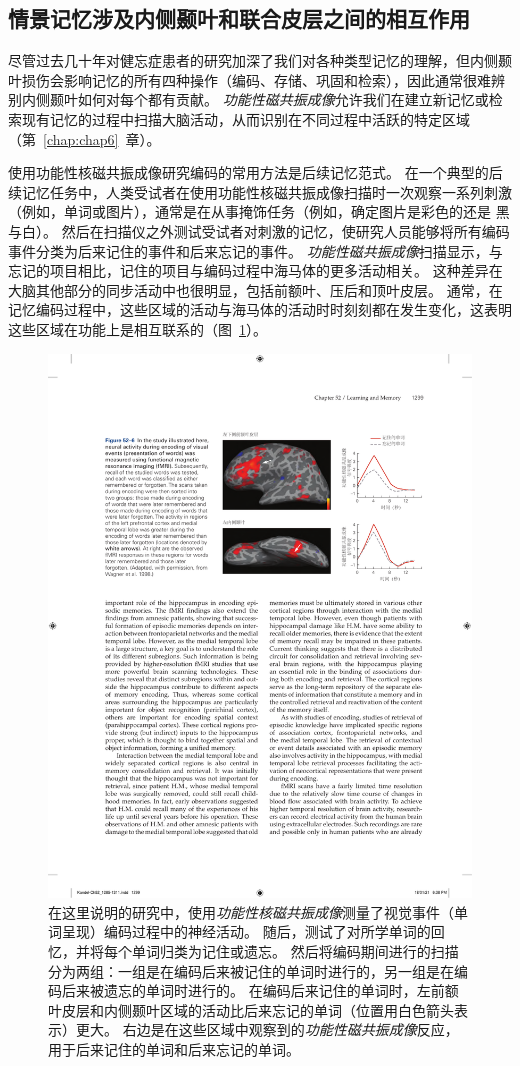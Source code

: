 \subsection{情景记忆涉及内侧颞叶和联合皮层之间的相互作用}

尽管过去几十年对健忘症患者的研究加深了我们对各种类型记忆的理解，但内侧颞叶损伤会影响记忆的所有四种操作（编码、存储、巩固和检索），因此通常很难辨别内侧颞叶如何对每个都有贡献。
\textit{功能性磁共振成像}允许我们在建立新记忆或检索现有记忆的过程中扫描大脑活动，从而识别在不同过程中活跃的特定区域（第~\ref{chap:chap6}~章）。


使用功能性核磁共振成像研究编码的常用方法是后续记忆范式。
在一个典型的后续记忆任务中，人类受试者在使用功能性核磁共振成像扫描时一次观察一系列刺激（例如，单词或图片），通常是在从事掩饰任务（例如，确定图片是彩色的还是 黑与白）。
然后在扫描仪之外测试受试者对刺激的记忆，使研究人员能够将所有编码事件分类为后来记住的事件和后来忘记的事件。
\textit{功能性磁共振成像}扫描显示，与忘记的项目相比，记住的项目与编码过程中海马体的更多活动相关。
这种差异在大脑其他部分的同步活动中也很明显，包括前额叶、压后和顶叶皮层。
通常，在记忆编码过程中，这些区域的活动与海马体的活动时时刻刻都在发生变化，这表明这些区域在功能上是相互联系的（图~\ref{fig:52_6}）。


\begin{figure}[htbp]
	\centering
	\includegraphics[width=0.81\linewidth]{chap52/fig_52_6}
	\caption{在这里说明的研究中，使用\textit{功能性核磁共振成像}测量了视觉事件（单词呈现）编码过程中的神经活动。
		随后，测试了对所学单词的回忆，并将每个单词归类为记住或遗忘。
		然后将编码期间进行的扫描分为两组：一组是在编码后来被记住的单词时进行的，另一组是在编码后来被遗忘的单词时进行的。
		在编码后来记住的单词时，左前额叶皮层和内侧颞叶区域的活动比后来忘记的单词（位置用白色箭头表示）更大。
		右边是在这些区域中观察到的\textit{功能性磁共振成像}反应，用于后来记住的单词和后来忘记的单词\cite{wagner1998building}。}
	\label{fig:52_6}
\end{figure}


